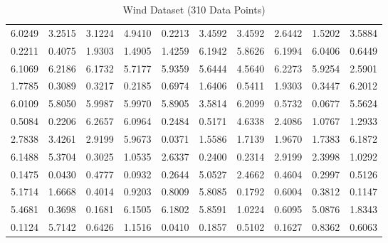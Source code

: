 \begin{table}[h]
\begin{tabular}{c c c c c c c c c c }
6.0249 & 3.2515 & 3.1224 & 4.9410 & 0.2213 & 3.4592 & 3.4592 & 2.6442 & 1.5202 & 3.5884 \\
0.2211 & 0.4075 & 1.9303 & 1.4905 & 1.4259 & 6.1942 & 5.8626 & 6.1994 & 6.0406 & 0.6449 \\
6.1069 & 6.2186 & 6.1732 & 5.7177 & 5.9359 & 5.6444 & 4.5640 & 6.2273 & 5.9254 & 2.5901 \\
1.7785 & 0.3089 & 0.3217 & 0.2185 & 0.6974 & 1.6406 & 0.5411 & 1.9303 & 0.3447 & 6.2012 \\
6.0109 & 5.8050 & 5.9987 & 5.9970 & 5.8905 & 3.5814 & 6.2099 & 0.5732 & 0.0677 & 5.5624 \\
0.5084 & 0.2206 & 6.2657 & 6.0964 & 0.2484 & 0.5171 & 4.6338 & 2.4086 & 1.0767 & 1.2933 \\
2.7838 & 3.4261 & 2.9199 & 5.9673 & 0.0371 & 1.5586 & 1.7139 & 1.9670 & 1.7383 & 6.1872 \\
6.1488 & 5.3704 & 0.3025 & 1.0535 & 2.6337 & 0.2400 & 0.2314 & 2.9199 & 2.3998 & 1.0292 \\
0.1475 & 0.0430 & 0.4777 & 0.0932 & 0.2644 & 5.0527 & 2.4662 & 0.4604 & 0.2997 & 0.5126 \\
5.1714 & 1.6668 & 0.4014 & 0.9203 & 0.8009 & 5.8085 & 0.1792 & 0.6004 & 0.3812 & 0.1147 \\
5.4681 & 0.3698 & 0.1681 & 6.1505 & 6.1802 & 5.8591 & 1.0224 & 0.6095 & 5.0876 & 1.8343 \\
0.1124 & 5.7142 & 0.6426 & 1.1516 & 0.0410 & 0.1857 & 0.5102 & 0.1627 & 0.8362 & 0.6063 \\
\hline
\end{tabular}
\caption{Wind Dataset (310 Data Points)}
\label{tab:wind_data}
\end{table}